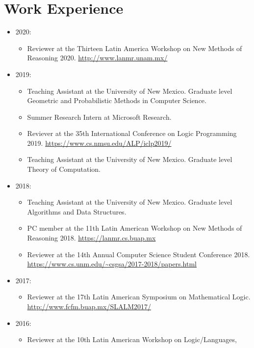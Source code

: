 \section{Work Experience}
\begin{itemize}
  \item 2020:
    \begin{itemize}
      \item Reviewer at the Thirteen Latin America 
        Workshop on New Methods of Reasoning 2020. 
        \url{http://www.lanmr.unam.mx/}
    \end{itemize}
  \item 2019:
    \begin{itemize}
      \item Teaching Assistant at the University of New Mexico. Graduate level
        Geometric and Probabilistic Methods in Computer Science.
      \item Summer Research Intern at Microsoft Research.
      \item Reviever at the 35th International Conference on Logic Programming
        2019. \url{https://www.cs.nmsu.edu/ALP/iclp2019/}
      \item Teaching Assistant at the University of New Mexico. Graduate level
        Theory of Computation.
    \end{itemize}
  \item 2018:
    \begin{itemize}
      \item Teaching Assistant at the University of New Mexico. Graduate level
        Algorithms and Data Structures.
      \item PC member at the 11th Latin American Workshop on New Methods of
        Reasoning 2018. \url{https://lanmr.cs.buap.mx}
      \item Reviewer at the 14th Annual Computer Science Student Conference
        2018. \url{https://www.cs.unm.edu/~csgsa/2017-2018/papers.html}
    \end{itemize}
  \item 2017:
    \begin{itemize}
      \item Reviewer at the 17th Latin American Symposium on Mathematical
        Logic. \url{http://www.fcfm.buap.mx/SLALM2017/}
    \end{itemize}
  \item 2016:
    \begin{itemize}
      \item Reviewer at the 10th Latin American Workshop on Logic/Languages,

\end{itemize}
\end{itemize}
